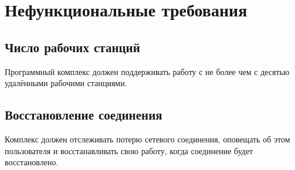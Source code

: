 \section{Нефункциональные требования }

\subsection{Число рабочих станций}
Программный комплекс должен поддерживать работу с не более чем с десятью удалёнными рабочими станциями.

\subsection{Восстановление соединения}
Комплекс должен отслеживать потерю сетевого соединения, оповещать об этом пользователя и восстанавливать свою работу, когда соединение будет восстановлено.
